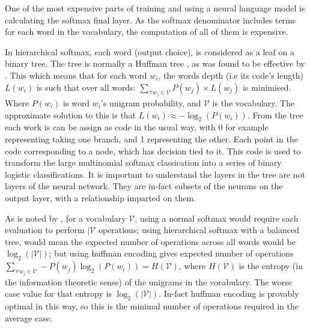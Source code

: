 \documentclass[parskip]{komatufte}
\begin{document}

One of the most expensive parts of training and using a neural language model is calculating the softmax final layer.
As the softmax denominator includes terms for each word in the vocabulary, the computation of all of them is expensive.

In hierarchical softmax, each word (output choice), is considered as a leaf on a binary tree.
The tree is normally a Huffman tree , as was found to be effective by .
This which means that for each word $w_i$, the words depth (i.e its code's length) $L(w_i)$ is such that over all words: $\sum_{\forall w_j \in \mathcal{V}} P(w_j)\times L(w_j)$ is minimised.
Where $P(w_i)$ is word $w_i$'s unigram probability, and $\mathcal{V}$ is the vocabulary.
The approximate solution to this is that $L(w_i) \approx -\log_2(P(w_i))$.
From the tree each work is can be assign as code in the usual way, with 0 for example representing taking one branch, and 1 representing the other.
Each point in the code corresponding to a node, which has decision tied to it.
This code is used to transform the large  multinomial softmax classication into a series of binary logistic classifications.
It is important to understand the layers in the tree are not layers of the neural network.
They are in-fact subsets of the neurons on the output layer, with a relationship imparted on them.

As is noted by , for a vocabulary $\mathcal{V}$,
using a normal softmax would require each evaluation to perform $|\mathcal{V}$ operations;
using hierarchical softmax with a balanced tree, would mean the expected number of operations across all words would be $\log_2(|\mathcal{V}|)$;
but using huffman encoding gives expected number of operations $\sum_{\forall w_j \in \mathcal{V}} -P(w_j)\log_2(P(w_i)) = H(\mathcal{V})$, where $H(\mathcal{V})$ is the entropy (in the information theoretic sense) of the unigrams in the vocabulary.
The worse case value for that entropy is $\log_2(|\mathcal{V}|)$.
In-fact huffman encoding is provably optimal in this way, so this is the minimal number of operations required in the average case.
\end{document}
